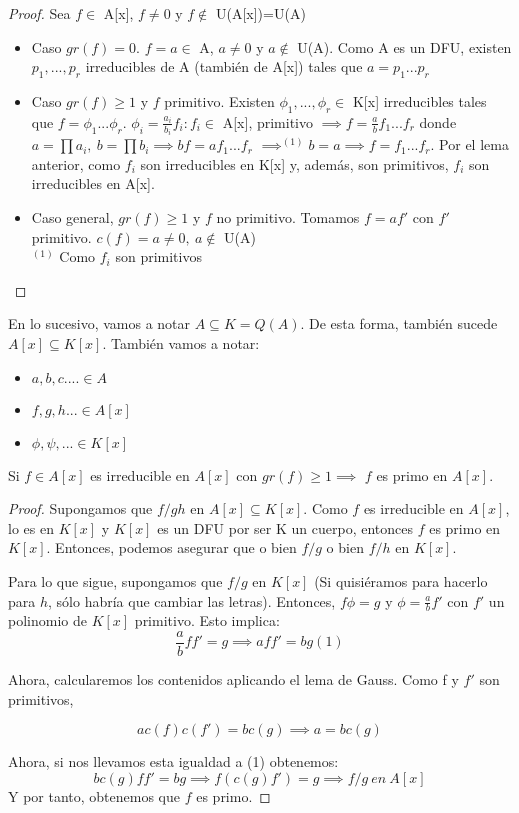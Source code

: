 \begin{proof}
Sea $f \in$ A[x], $f \neq 0$ y $f \notin$ U(A[x])=U(A)
\begin{itemize}
	\item Caso $gr(f) = 0$. $f = a \in$ A, $a \neq 0$ y $a \notin$ U(A). Como A es un DFU, existen $p_1,...,p_r$ irreducibles de A (también de A[x]) tales que $a = p_1...p_r$
	\item Caso $gr(f) \geq 1$ y $f$ primitivo. Existen $\phi_1,...,\phi_r \in$ K[x] irreducibles tales que $f=\phi_1...\phi_r$. $\phi_i = \frac{a_i}{b_i}f_i : f_i \in$ A[x], primitivo $\implies f = \frac{a}{b}f_1...f_r$ donde $a=\prod a_i,\ b=\prod b_i \implies bf = af_1...f_r$ $\implies^{(1)} b=a \implies f = f_1...f_r$. Por el lema anterior, como $f_i$ son irreducibles en K[x] y, además, son primitivos, $f_i$ son irreducibles en A[x].
	\item Caso general, $gr(f) \geq 1$ y $f$ no primitivo. Tomamos $f=af'$
con $f'$ primitivo. $c(f) = a \neq 0,\ a \notin$ U(A)\\
$^{(1)}$ Como $f_i$ son primitivos
\end{itemize}
\end{proof}


En lo sucesivo, vamos a notar $A\subseteq K = Q(A)$. De esta forma, también sucede $A[x] \subseteq K[x]$. También vamos a notar:
\begin{itemize}
	\item $a,b,c.... \in A$
	\item $f,g,h... \in A[x]$
	\item $\phi,\psi, ... \in K[x]$
\end{itemize}

\begin{ncor}
	Si $f\in A[x]$ es irreducible en $A[x]$ con $gr(f) \geq 1\implies$ $f$ es primo en $A[x]$.
\end{ncor}
\begin{proof}
	Supongamos que $f/gh$ en $A[x]\subseteq K[x]$. Como $f$ es irreducible en $A[x]$, lo  es en $K[x]$ y $K[x]$ es un DFU por ser K un cuerpo, entonces $f$ es primo en $K[x]$. Entonces, podemos asegurar que o bien $f/g$ o bien $f/h$ en $K[x]$.

	Para lo que sigue, supongamos que $f/g$ en $K[x]$ (Si quisiéramos para hacerlo para $h$, sólo habría que cambiar las letras). Entonces, $f\phi = g $ y $\phi = \frac{a}{b}f'$ con $f'$ un polinomio de $K[x]$ primitivo. Esto implica: $$\frac{a}{b}ff'=g \implies aff' = bg(1)$$

	Ahora, calcularemos los contenidos aplicando el lema de Gauss. Como f y $f'$ son primitivos,

	$$ a c(f)c(f') = bc(g) \implies a = bc(g)$$

	Ahora, si nos llevamos esta igualdad a (1) obtenemos:
	\[
	bc(g)ff'=bg \implies f(c(g)f')=g \implies f/g \ en \ A[x]
	\]
	Y por tanto, obtenemos que $f$ es primo.
\end{proof}

